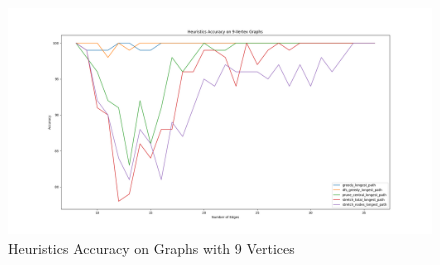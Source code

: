 \documentclass[twocolumn,showpacs,%
  nofootinbib,aps,superscriptaddress,%
  eqsecnum,prd,notitlepage,showkeys,11pt]{article}
\begin{document}
\begin{figure}[htp]
    \centering
    \includegraphics[width=\linewidth]{Accuracy9VertexAll.png}
    \caption{Heuristics Accuracy on Graphs with 9 Vertices}
    \label{fig:Accuracy}
\end{figure}
\end{document}
